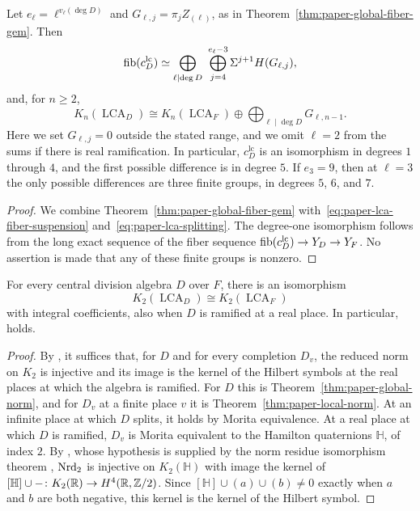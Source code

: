 \begin{corollary}
\label{cor:paper-lca-gem}
Let $e_\ell=\ell^{v_\ell(\deg D)}$ and $G_{\ell,j}=\pi_jZ_{(\ell)}$, as in Theorem~\ref{thm:paper-global-fiber-gem}.
Then
\[
 \operatorname{fib}(c^{\mathrm{lc}}_D)\simeq
 \bigoplus_{\ell\mid\deg D}\ \bigoplus_{j=4}^{e_\ell-3}
       \Sigma^{j+1}H(G_{\ell,j}),
\]
and, for $n\ge2$,
\[
 K_n(\operatorname{LCA}_D)\cong
 K_n(\operatorname{LCA}_F)\oplus
       \bigoplus_{\ell\mid\deg D}G_{\ell,n-1}.
\]
Here we set $G_{\ell,j}=0$ outside the stated range, and we omit $\ell=2$ from the sums if there is real ramification.
In particular, $c^{\mathrm{lc}}_D$ is an isomorphism in degrees $1$ through $4$, and the first possible difference is in degree $5$.
If $e_3=9$, then at $\ell=3$ the only possible differences are three finite groups, in degrees $5$, $6$, and $7$.
\end{corollary}
\begin{proof}
We combine Theorem~\ref{thm:paper-global-fiber-gem} with~\eqref{eq:paper-lca-fiber-suspension} and~\eqref{eq:paper-lca-splitting}.
The degree-one isomorphism follows from the long exact sequence of the fiber sequence $\operatorname{fib}(c^{\mathrm{lc}}_D)\to Y_D\to Y_F$.
No assertion is made that any of these finite groups is nonzero.
\end{proof}

\begin{theorem}\label{thm:paper-lca-k2}
For every central division algebra $D$ over $F$, there is an isomorphism
\[
 K_2(\operatorname{LCA}_D)\cong K_2(\operatorname{LCA}_F)
\]
with integral coefficients, also when $D$ is ramified at a real place.
In particular, \cite[Conjecture 10.2]{BHRAdeles} holds.
\end{theorem}
\begin{proof}
By \cite[Theorem 10.5]{BHRAdeles}, it suffices that, for $D$ and for every completion $D_v$, the reduced norm on $K_2$ is injective and its image is the kernel of the Hilbert symbols at the real places at which the algebra is ramified.
For $D$ this is Theorem~\ref{thm:paper-global-norm}, and for $D_v$ at a finite place $v$ it is Theorem~\ref{thm:paper-local-norm}.
At an infinite place at which $D$ splits, it holds by Morita equivalence.
At a real place at which $D$ is ramified, $D_v$ is Morita equivalent to the Hamilton quaternions $\mathbb H$, of index $2$.
By \cite[Corollary 2]{KahnLevine2010}, whose hypothesis is supplied by the norm residue isomorphism theorem \cite{Voevodsky}, $\operatorname{Nrd}_2$ is injective on $K_2(\mathbb H)$ with image the kernel of $[\mathbb H]\cup-\colon K_2(\mathbb R)\to H^4(\mathbb R,\mathbb Z/2)$.
Since $[\mathbb H]\cup(a)\cup(b)\ne0$ exactly when $a$ and $b$ are both negative, this kernel is the kernel of the Hilbert symbol.
\end{proof}

